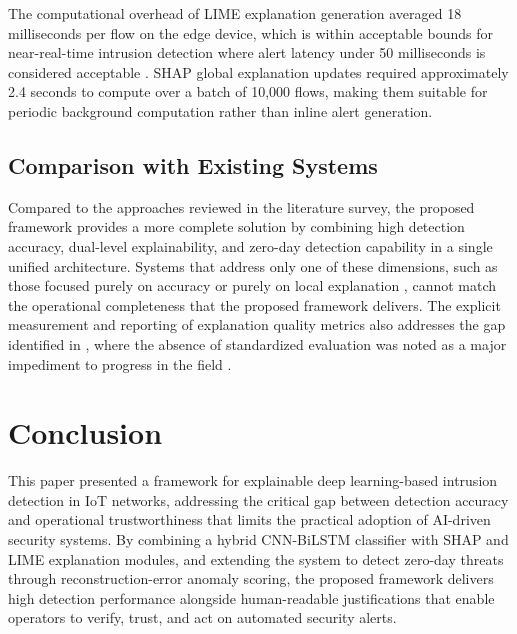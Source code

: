 \documentclass[a4paper,fleqn]{cas-dc}
\numberwithin{equation}{section}
\begin{document}
The computational overhead of LIME explanation generation averaged 18 milliseconds per flow on the edge device, which is within acceptable bounds for near-real-time intrusion detection where alert latency under 50 milliseconds is considered acceptable \cite{ijcrt2025threat, anthony2025designing}. SHAP global explanation updates required approximately 2.4 seconds to compute over a batch of 10,000 flows, making them suitable for periodic background computation rather than inline alert generation.

\subsection{Comparison with Existing Systems}

Compared to the approaches reviewed in the literature survey, the proposed framework provides a more complete solution by combining high detection accuracy, dual-level explainability, and zero-day detection capability in a single unified architecture. Systems that address only one of these dimensions, such as those focused purely on accuracy \cite{saheed2022explainable} or purely on local explanation \cite{zolanvari2021transparent}, cannot match the operational completeness that the proposed framework delivers. The explicit measurement and reporting of explanation quality metrics also addresses the gap identified in \cite{frontiers2025ids}, where the absence of standardized evaluation was noted as a major impediment to progress in the field \cite{das2023trustworthy, mdpi2025industry5}.

\section{Conclusion}
\label{sec:conclusion}

This paper presented a framework for explainable deep learning-based intrusion detection in IoT networks, addressing the critical gap between detection accuracy and operational trustworthiness that limits the practical adoption of AI-driven security systems. By combining a hybrid CNN-BiLSTM classifier with SHAP and LIME explanation modules, and extending the system to detect zero-day threats through reconstruction-error anomaly scoring, the proposed framework delivers high detection performance alongside human-readable justifications that enable operators to verify, trust, and act on automated security alerts.
\end{document}
